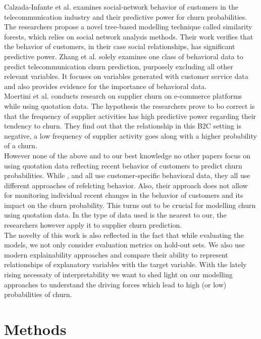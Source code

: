 \documentclass[12pt,titlepage]{article}
\begin{document}
Calzada-Infante et al. \cite{calzada} examines social-network behavior of customers in the telecommunication industry and their predictive power for churn probabilities. The researchers propose a novel tree-based modelling technique called similarity forests, which relies on social network analysis methods. Their work verifies that the behavior of customers, in their case social relationships, has significant predictive power. Zhang et al. \cite{zhang} solely examines one class of behavioral data to predict telecommunication churn prediction, purposely excluding all other relevant variables. It focuses on variables generated with customer service data and also provides evidence for the importance of behavioral data. \\
Moertini et al. \cite{moertini} conducts research on supplier churn on e-commerce platforms while using quotation data. The hypothesis the researchers prove to bo correct is that the frequency of supplier activities has high predictive power regarding their tendency to churn. They find out that the relationship in this B2C setting is negative, a low frequency of supplier activity goes along with a higher probability of a churn. \\
However none of the above and to our best knowledge no other papers focus on using quotation data reflecting recent behavior of customers to predict churn probabilities. While \cite{khodabandehlou}, \cite{calzada} and \cite{zhang} all use customer-specific behavioral data, they all use different approaches of refelcting behavior. Also, their approach does not allow for monitoring individual recent changes in the behavior of customers and its impact on the churn probability. This turns out to be crucial for modelling churn using quotation data. In \cite{moertini} the type of data used is the nearest to our, the researchers however apply it to supplier churn prediction. \\
The novelty of this work is also reflected in the fact that while evaluating the models, we not only consider evaluation metrics on hold-out sets. We also use modern explainability approaches and compare their ability to represent relationships of explanatory variables with the target variable. With the lately rising necessaty of interpretability we want to shed light on our modelling approaches to understand the driving forces which lead to high (or low) probabilities of churn. \\


\section{Methods} \par
\end{document}

